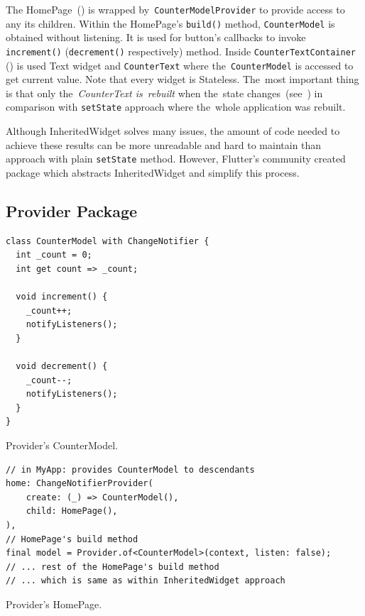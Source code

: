 The HomePage~() is wrapped by~\verb|CounterModelProvider| to provide access to any its children. Within the HomePage's \verb|build()| method, \verb|CounterModel| is obtained without listening. It is used for button's callbacks to invoke \verb|increment()| (\verb|decrement()| respectively) method. Inside \verb|CounterTextContainer| () is used Text widget and \verb|CounterText| where the~\verb|CounterModel| is accessed to get current value. Note that every widget is Stateless. The~most important thing is that only the~\textit{CounterText is~rebuilt} when the~state changes~(see~) in comparison with \verb|setState| approach where the~whole application was rebuilt.

Although InheritedWidget solves many issues, the amount of code needed to achieve these results can be more unreadable and hard to maintain than approach with plain \verb|setState| method. However, Flutter's community created package which abstracts InheritedWidget and simplify this process. 
\subsection{Provider Package}

\begin{listing}[ht]
\begin{verbatim}
class CounterModel with ChangeNotifier {
  int _count = 0;
  int get count => _count;

  void increment() {
    _count++;
    notifyListeners();
  }

  void decrement() {
    _count--;
    notifyListeners();
  }
}
\end{verbatim}
\caption{Provider's CounterModel.}
\label{listing:counter-provider-model}
\end{listing}

\begin{listing}[ht]
\begin{verbatim}
// in MyApp: provides CounterModel to descendants
home: ChangeNotifierProvider(
    create: (_) => CounterModel(),
    child: HomePage(),
),
// HomePage's build method
final model = Provider.of<CounterModel>(context, listen: false);
// ... rest of the HomePage's build method
// ... which is same as within InheritedWidget approach
\end{verbatim}
\caption{Provider's HomePage.}
\label{listing:counter-provider-home-page}
\end{listing}

